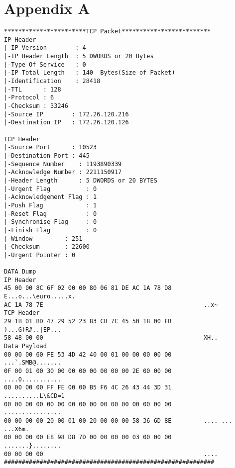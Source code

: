 \chapter{Appendix A}
\begin{lstlisting}[caption={TCP Data Package},label={lst:data_dump},mathescape]
***********************TCP Packet*************************
IP Header
|-IP Version        : 4
|-IP Header Length  : 5 DWORDS or 20 Bytes
|-Type Of Service   : 0
|-IP Total Length   : 140  Bytes(Size of Packet)
|-Identification    : 28418
|-TTL      : 128
|-Protocol : 6
|-Checksum : 33246
|-Source IP        : 172.26.120.216
|-Destination IP   : 172.26.120.126

TCP Header
|-Source Port      : 10523
|-Destination Port : 445
|-Sequence Number    : 1193890339
|-Acknowledge Number : 2211150917
|-Header Length      : 5 DWORDS or 20 BYTES
|-Urgent Flag          : 0
|-Acknowledgement Flag : 1
|-Push Flag            : 1
|-Reset Flag           : 0
|-Synchronise Flag     : 0
|-Finish Flag          : 0
|-Window         : 251
|-Checksum       : 22600
|-Urgent Pointer : 0

DATA Dump                         
IP Header
45 00 00 8C 6F 02 00 00 80 06 81 DE AC 1A 78 D8         E...o...\euro.....x.
AC 1A 78 7E                                             ..x~
TCP Header
29 1B 01 BD 47 29 52 23 83 CB 7C 45 50 18 00 FB         )...G)R#..|EP...
58 48 00 00                                             XH..
Data Payload
00 00 00 60 FE 53 4D 42 40 00 01 00 00 00 00 00         ...`.SMB@.......
0F 00 01 00 30 00 00 00 00 00 00 00 2E 00 00 00         ....0...........
00 00 00 00 FF FE 00 00 B5 F6 4C 26 43 44 3D 31         ..........L\&CD=1
00 00 00 00 00 00 00 00 00 00 00 00 00 00 00 00         ................
00 00 00 00 20 00 01 00 20 00 00 00 58 36 6D 8E         .... ... ...X6m.
00 00 00 00 E8 98 D8 7D 00 00 00 00 03 00 00 00         .......}........
00 00 00 00                                             ....
###########################################################
\end{lstlisting}